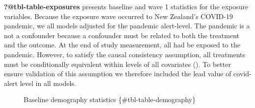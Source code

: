 \documentclass[
  singlecolumn]{article}
\begin{document}
\begin{description}
\item[\textbf{?@tbl-table-exposures} presents baseline and wave 1
statistics for the exposure variables. Because the exposure wave
occurred to New Zealand's COVID-19 pandemic, we all models adjusted for
the pandemic alert-level. The pandemic is a not a confounder because a
confounder must be related to both the treatment and the outcome. At the
end of study measurement, all had be exposed to the pandemic. However,
to satisfy the causal consistency assumption, all treatments must be
conditionally equivalent within levels of all covariates
(). To better
ensure validation of this assumption we therefore included the lead
value of covid-alert level in all models.]
Baseline demography statistics \{\#tbl-table-demography\}
\end{description}
\end{document}
